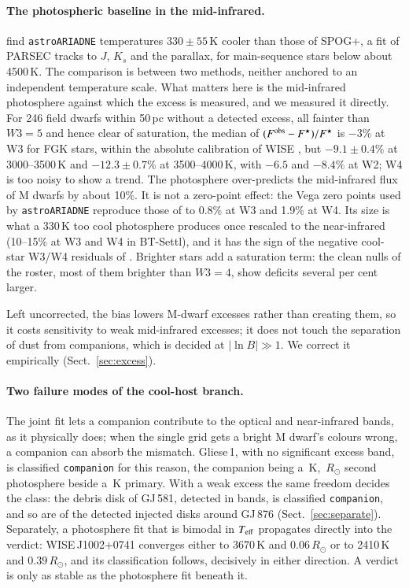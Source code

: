\documentclass{aa}
\newcommand{\ariadne}{\texttt{astroARIADNE}}
\newcommand{\Rsun}{R_\odot}
\begin{document}
\paragraph{The photospheric baseline in the mid-infrared.} \citet{stefanov2026}
find \ariadne{} temperatures $330 \pm 55$\,K cooler than those of SPOG+, a fit of
PARSEC tracks to $J$, $K_s$ and the parallax, for main-sequence stars below about
4500\,K. The comparison is between two methods, neither anchored to an
independent temperature scale. What matters here is the mid-infrared photosphere
against which the excess is measured, and we measured it directly. For 246 field
dwarfs within 50\,pc without a detected excess, all fainter than $W3 = 5$ and
hence clear of saturation, the median of $(F^{\rm obs} - F^\star)/F^\star$ is
$-3\%$ at W3 for FGK stars, within the absolute calibration of WISE
\citep{wright2010,jarrett2011}, but $-9.1 \pm 0.4\%$ at 3000--3500\,K and
$-12.3 \pm 0.7\%$ at 3500--4000\,K, with $-6.5$ and $-8.4\%$ at W2; W4 is too noisy
to show a trend. The photosphere over-predicts the mid-infrared flux of M dwarfs
by about 10\%. It is not a zero-point effect: the Vega zero points used by
\ariadne{} reproduce those of \citet{jarrett2011} to 0.8\% at W3 and 1.9\% at W4.
Its size is what a 330\,K too cool photosphere produces once rescaled to the
near-infrared (10--15\% at W3 and W4 in BT-Settl), and it has the sign of the
negative cool-star W3/W4 residuals of \citet{cotten2016}. Brighter stars add a
saturation term: the clean nulls of the roster, most of them brighter than
$W3 = 4$, show deficits several per cent larger.

Left uncorrected, the bias lowers M-dwarf excesses rather than creating them, so
it costs sensitivity to weak mid-infrared excesses; it does not touch the
separation of dust from companions, which is decided at $|\ln B| \gg 1$. We
correct it empirically (Sect.~\ref{sec:excess}).

\paragraph{Two failure modes of the cool-host branch.} The joint fit lets a
companion contribute to the optical and near-infrared bands, as it physically
does; when the single grid gets a bright M dwarf's colours wrong, a companion can
absorb the mismatch. Gliese\,1, with no significant excess band, is
classified \texttt{companion} for this reason, the companion being a
\glOneTtwo\,K, \glOneRtwo\,$\Rsun$ second photosphere beside a \glOneTeff\,K primary. With a
weak excess the same freedom decides the class: the debris disk of GJ\,581, detected
in \gjFiveNsig{} bands, is classified \texttt{companion}, and so are \injDetCompGJ{} of the \injDetGJ{}
detected injected disks around GJ\,876 (Sect.~\ref{sec:separate}). Separately, a photosphere fit that
is bimodal in $T_{\rm eff}$ propagates directly into the verdict: WISE\,J1002+0741
converges either to 3670\,K and $0.06\,\Rsun$ or to 2410\,K and $0.39\,\Rsun$, and
its classification follows, decisively in either direction. A verdict is only as
stable as the photosphere fit beneath it.
\end{document}
